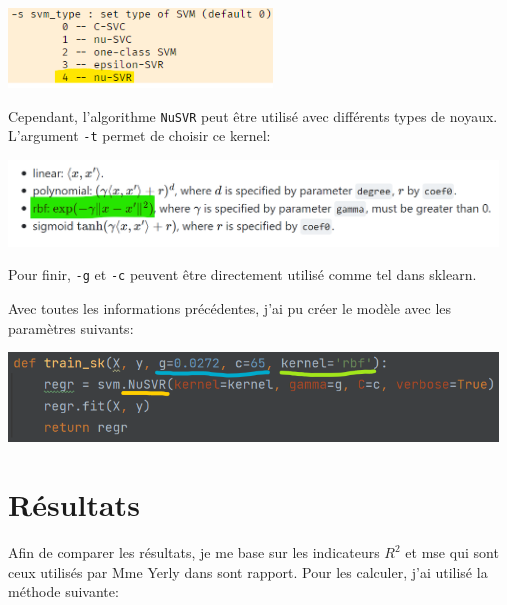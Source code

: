 \begin{center}
    \includegraphics[width=70mm]{img/libsvm-parameter.png}
\end{center}

Cependant, l'algorithme \texttt{NuSVR} peut être utilisé avec différents types de noyaux.
L'argument \texttt{-t} permet de choisir ce kernel:
\begin{center}
    \includegraphics[width=130mm]{img/kernel-parameter.png}
\end{center}

Pour finir, \texttt{-g} et \texttt{-c} peuvent être directement utilisé comme tel dans \acrlong{sklearn}.

Avec toutes les informations précédentes, j'ai pu créer le modèle avec les paramètres suivants:
\begin{center}
    \includegraphics[width=130mm]{img/my-parameter.png}
\end{center}


\section{Résultats}
Afin de comparer les résultats, je me base sur les indicateurs $R^2$ et \acrfull{mse} qui sont ceux utilisés par Mme Yerly dans sont rapport\cite{IL_SVM_report}.
Pour les calculer, j'ai utilisé la méthode suivante:

